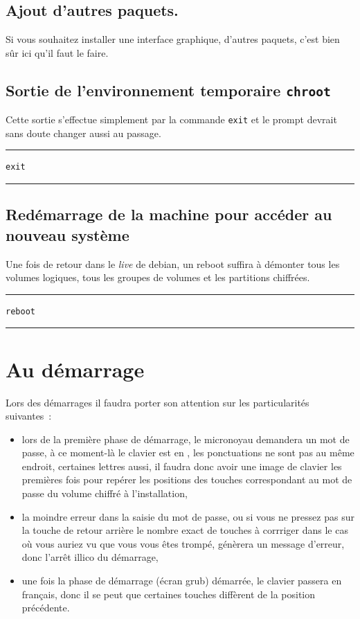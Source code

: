\documentclass[12pt, a4paper]{report}
\begin{document}
\section{Ajout d'autres paquets.}
Si vous souhaitez installer une interface graphique, d'autres paquets, c'est bien sûr ici qu'il faut le faire.

\section{Sortie de l'environnement temporaire \texttt{chroot}}
Cette sortie s'effectue simplement par la commande \texttt{exit} et le prompt devrait sans doute changer aussi au passage.

\noindent \rule{\linewidth}{0.5pt}
\begin{verbatim}
exit
\end{verbatim}
\rule{\linewidth}{0.5pt}

\section{Redémarrage de la machine pour accéder au nouveau système}
Une fois de retour dans le \emph{live} de debian, un reboot suffira à démonter tous les volumes logiques, tous les groupes de volumes et les partitions chiffrées.

\noindent \rule{\linewidth}{0.5pt}
\begin{verbatim}
reboot
\end{verbatim}
\rule{\linewidth}{0.5pt}

\chapter{Au démarrage}
Lors des démarrages il faudra porter son attention sur les particularités suivantes~:
\begin{itemize}
	\item lors de la première phase de démarrage, le micronoyau demandera un mot de passe, à ce moment-là le clavier est en , les ponctuations ne sont pas au même endroit, certaines lettres aussi, il faudra donc avoir une image de clavier  les premières fois pour repérer les positions des touches correspondant au mot de passe du volume chiffré à l'installation,
	\item la moindre erreur dans la saisie du mot de passe, ou si vous ne pressez pas sur la touche de retour arrière le nombre exact de touches à corrriger dans le cas où vous auriez vu que vous vous êtes trompé, génèrera un message d'erreur, donc l'arrêt illico du démarrage,
	\item une fois la phase de démarrage (écran grub) démarrée, le clavier passera en français, donc il se peut que certaines touches diffèrent de la position précédente.
\end{itemize}
\end{document}
